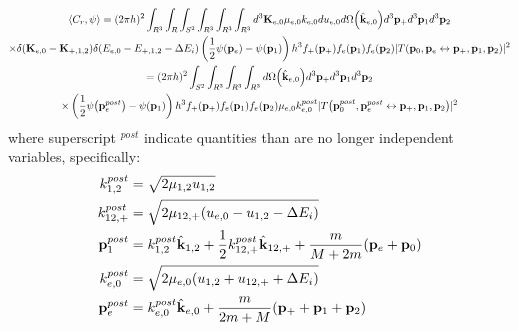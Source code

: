 \documentclass{article}[draft]
\begin{document}
\begin{multline*}
\left< C_r, \psi \right>  =
(2\pi h)^2 
\int_{R^3} \int_{R} \int_{S^2}
\int_{R^3} \int_{R^3} \int_{R^3} 
d^3 \vect{K}_{e,0} \mu_{e,0} k_{e,0} d u_{e,0} d \Omega\of{\hat{\vect{k}}_{e,0}}
d^3 \vect{p}_+ d^3 \vect{p}_1 d^3 \vect{p}_2 
\\
\times
\delta\of{\vect{K}_{e,0} - \vect{K}_{+,1,2}} 
\delta\of{E_{e,0} - E_{+,1,2} - \Delta E_i}
\left( \frac12 \psi\of{\vect{p}_e}
- \psi\of{\vect{p}_1} \right) h^3 f_+\of{\vect{p}_+} f_e\of{\vect{p}_1}  f_e\of{\vect{p}_2} 
| T\of{\vect{p}_0, \vect{p}_e \leftrightarrow \vect{p}_+, \vect{p}_1, \vect{p}_2} |^2
\\
=
(2\pi h)^2 
\int_{S^2} 
\int_{R^3} \int_{R^3} \int_{R^3} 
d \Omega\of{\hat{\vect{k}}_{e,0}}
d^3 \vect{p}_+ d^3 \vect{p}_1 d^3 \vect{p}_2 
\\
\times
\left( \frac12 \psi\of{\vect{p}_e^{post}}
- \psi\of{\vect{p}_1} \right) h^3 f_+\of{\vect{p}_+} f_e\of{\vect{p}_1}  f_e\of{\vect{p}_2} 
\mu_{e,0} k_{e,0}^{post} 
| T\of{\vect{p}_0^{post}, \vect{p}_e^{post} \leftrightarrow \vect{p}_+, \vect{p}_1, \vect{p}_2} |^2
\end{multline*}
where superscript $^{post}$ indicate quantities than are no longer independent variables, specifically:
\begin{align*}
k^{post}_{1,2} &= \sqrt{ 2 \mu_{1,2} u_{1,2}} \\
k^{post}_{12,+} &= \sqrt{ 2 \mu_{12,+} (u_{e,0} - u_{1,2} - \Delta E_i)} \\
\mathbf{p}^{post}_1 &= k^{post}_{1,2} \hat{\mathbf{k}}_{1,2} + \frac12 k^{post}_{12,+} \hat{\mathbf{k}}_{12,+} + \frac{m}{M+2m} (\mathbf{p}_e + \mathbf{p}_0) \\
k^{post}_{e,0} &= \sqrt{ 2 \mu_{e,0} (u_{1,2} + u_{12,+} + \Delta E_i)} \\
\mathbf{p}^{post}_e &= k^{post}_{e,0} \hat{\mathbf{k}}_{e,0} + \frac{m}{2m + M} (\mathbf{p}_+ + \mathbf{p}_1 + \mathbf{p}_2)
\end{align*}
\end{document}
